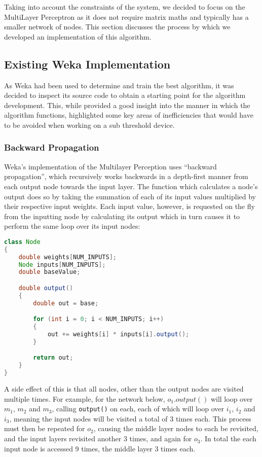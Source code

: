 
Taking into account the constraints of the system, we decided to focus on the MultiLayer Perceptron as it does not require matrix maths and typically has a smaller network of nodes. This section discusses the process by which we developed an implementation of this algorithm.

\subsection{Existing Weka Implementation \label{sec:weka-code}}

As Weka had been used to determine and train the best algorithm, it was decided to inspect its source code to obtain a starting point for the algorithm development. This, while provided a good insight into the manner in which the algorithm functions, highlighted some key areas of inefficiencies that would have to be avoided when working on a sub threshold device.

\subsubsection{Backward Propagation}

Weka's implementation of the Multilayer Perception uses ``backward propagation'', which recursively works backwards in a depth-first manner from each output node towards the input layer. The function which calculates a node's output does so by taking the summation of each of its input values multiplied by their respective input weights. Each input value, however, is requested on the fly from the inputting node by calculating its output which in turn causes it to perform the same loop over its input nodes:

\begin{lstlisting}[language=Java,caption={Weka's method of calculating a node's output}]
class Node
{
    double weights[NUM_INPUTS];
    Node inputs[NUM_INPUTS];
    double baseValue;

    double output()
    {
        double out = base;

        for (int i = 0; i < NUM_INPUTS; i++)
        {
            out += weights[i] * inputs[i].output();
        }

        return out;
    }
}
\end{lstlisting}

A side effect of this is that all nodes, other than the output nodes are visited multiple times. For example, for the network below, $o_1.output()$ will loop over $m_1$, $m_2$ and $m_3$, calling \verb|output()| on each, each of which will loop over $i_1$, $i_2$ and $i_3$, meaning the input nodes will be visited a total of 3 times each. This process must then be repeated for $o_2$, causing the middle layer nodes to each be revisited, and the input layers revisited another 3 times, and again for $o_3$. In total the each input node is accessed 9 times, the middle layer 3 times each.

